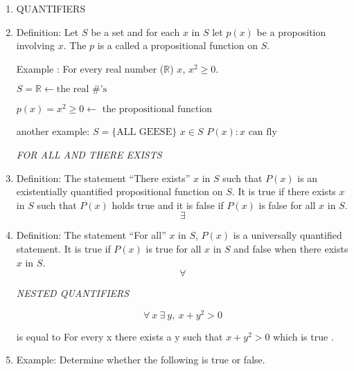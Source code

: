 \documentclass[10pt,letterpaper]{article}
\begin{document}
{

\begin{enumerate}
    \item[]
    \begin{center}
                QUANTIFIERS
    \end{center}
    \vspace{1.0em}
    \item[] Definition: Let $S$ be a set and for each $x$ in $S$ let $p(x)$ be a proposition involving $x$. The $p$ is a called a propositional function on $S$.
    
    Example : \quad For every real number ($\mathbb{R}$) $x$, \quad $x^{2} \geq 0.$
    
    \qquad $S = \mathbb{R} \leftarrow \text{the real \#'s}$
    
    \qquad $p(x) =  x^{2} \geq 0 \leftarrow \text{ the propositional function }$
    
    another example: $S = \{ \text{ALL GEESE} \}$ \quad $x \in S$ \quad $P(x): x \text{ can fly}$
    
    \vspace{1em}
    
    \begin{center}
        \textit{FOR ALL AND THERE EXISTS}
    \end{center}
    \item[] Definition: The statement ``There exists'' $x$ in $S$ such that $P(x)$ is an existentially quantified propositional function on $S$. It is true if there exists $x$ in $S$ such that $P(x)$ holds true and it is false if $P(x)$ is false for all $x$ in $S$.$$\exists$$
    
    \item[] Definition: The statement ``For all'' $x$ in $S$, $P(x)$ is a universally quantified statement. It is true if $P(x)$ is true for all $x$ in $S$ and false when there exists $x$ in $S$. 
    $$\forall$$
    
    \vspace{1em}
    \newpage
    \begin{center}
        \textit{NESTED QUANTIFIERS}
    \end{center}
    
    $$\forall  \ x \ \exists \ y , \ x + y^{2} > 0$$
    
    is equal to For every x there exists a y such that $x + y^{2} > 0$ which is true \checkmark.
    
    \item[] Example: Determine whether the following is true or false.
    

\end{enumerate}}
\end{document}
